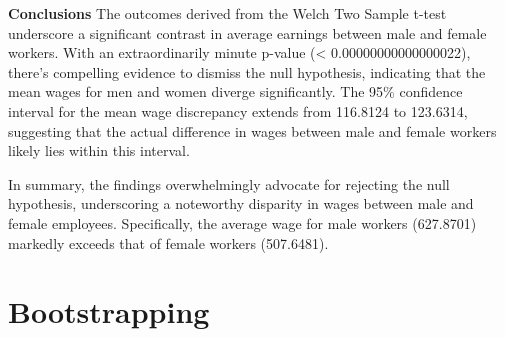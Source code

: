 \documentclass[
]{article}
\newenvironment{Shaded}{\begin{snugshade}}{\end{snugshade}}
\newcommand{\AttributeTok}[1]{\textcolor[rgb]{0.13,0.29,0.53}{#1}}
\newcommand{\CommentTok}[1]{\textcolor[rgb]{0.56,0.35,0.01}{\textit{#1}}}
\newcommand{\ConstantTok}[1]{\textcolor[rgb]{0.56,0.35,0.01}{#1}}
\newcommand{\ControlFlowTok}[1]{\textcolor[rgb]{0.13,0.29,0.53}{\textbf{#1}}}
\newcommand{\DecValTok}[1]{\textcolor[rgb]{0.00,0.00,0.81}{#1}}
\newcommand{\FloatTok}[1]{\textcolor[rgb]{0.00,0.00,0.81}{#1}}
\newcommand{\FunctionTok}[1]{\textcolor[rgb]{0.13,0.29,0.53}{\textbf{#1}}}
\newcommand{\NormalTok}[1]{#1}
\newcommand{\OtherTok}[1]{\textcolor[rgb]{0.56,0.35,0.01}{#1}}
\newcommand{\SpecialCharTok}[1]{\textcolor[rgb]{0.81,0.36,0.00}{\textbf{#1}}}
\newcommand{\StringTok}[1]{\textcolor[rgb]{0.31,0.60,0.02}{#1}}
\begin{document}
\textbf{Conclusions} The outcomes derived from the Welch Two Sample
t-test underscore a significant contrast in average earnings between
male and female workers. With an extraordinarily minute p-value
(\textless{} 0.00000000000000022), there's compelling evidence to
dismiss the null hypothesis, indicating that the mean wages for men and
women diverge significantly. The 95\% confidence interval for the mean
wage discrepancy extends from 116.8124 to 123.6314, suggesting that the
actual difference in wages between male and female workers likely lies
within this interval.

In summary, the findings overwhelmingly advocate for rejecting the null
hypothesis, underscoring a noteworthy disparity in wages between male
and female employees. Specifically, the average wage for male workers
(627.8701) markedly exceeds that of female workers (507.6481).

\section{Bootstrapping}\label{bootstrapping}

\begin{Shaded}
\end{Shaded}
\end{document}
